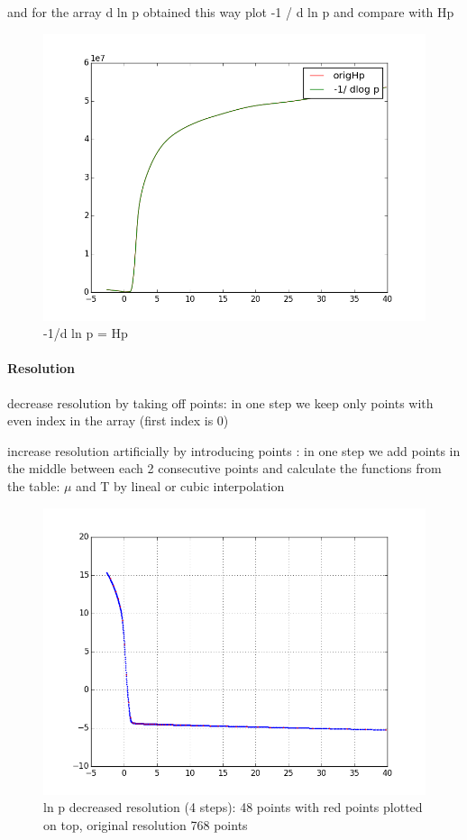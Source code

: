 \documentclass[10pt]{book}
\begin{document}
and for the array  d ln p obtained this way plot -1 / d ln p and compare with Hp

\begin{figure}[H]
 \centering
 \includegraphics[scale=0.5]{fromFilePyTest.png}
 \caption{-1/d ln p = Hp}
\end{figure}


\paragraph{Resolution}

decrease resolution by taking off points: in one step we keep only points with even index in the array (first index is 0)

increase resolution artificially  by introducing points : in one step we add points in the middle between each 2 consecutive points and calculate
the functions from the table: $\mu$ and T by lineal or cubic interpolation


\begin{figure}[H]
 \centering
 \includegraphics[scale=0.5]{testData48.png}
 \caption{ln p decreased resolution (4 steps): 48 points with red points plotted on top, original resolution 768 points }
\end{figure}
\end{document}
